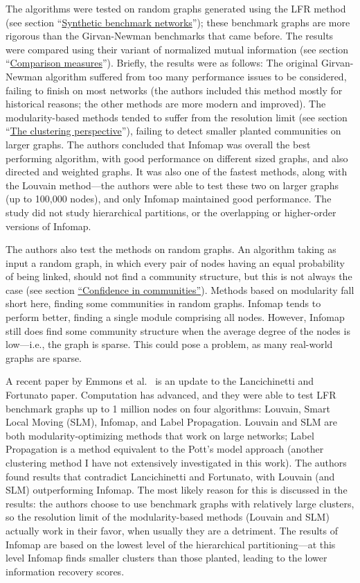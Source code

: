 The algorithms were tested on random graphs generated using the LFR
method (see section
``\protect\hyperlink{synthetic-benchmark-networks}{Synthetic benchmark
networks}''); these benchmark graphs are more rigorous than the
Girvan-Newman benchmarks that came before. The results were compared
using their variant of normalized mutual information (see section
``\protect\hyperlink{comparison-measures}{Comparison measures}'').
Briefly, the results were as follows: The original Girvan-Newman
algorithm suffered from too many performance issues to be considered,
failing to finish on most networks (the authors included this method
mostly for historical reasons; the other methods are more modern and
improved). The modularity-based methods tended to suffer from the
resolution limit (see section
``\protect\hyperlink{the-clustering-perspective}{The clustering
perspective}''), failing to detect smaller planted communities on larger
graphs. The authors concluded that Infomap was overall the best
performing algorithm, with good performance on different sized graphs,
and also directed and weighted graphs. It was also one of the fastest
methods, along with the Louvain method---the authors were able to test
these two on larger graphs (up to 100,000 nodes), and only Infomap
maintained good performance. The study did not study hierarchical
partitions, or the overlapping or higher-order versions of Infomap.

The authors also test the methods on random graphs. An algorithm taking
as input a random graph, in which every pair of nodes having an equal
probability of being linked, should not find a community structure, but
this is not always the case (see section
\protect\hyperlink{confidence-in-communities}{``Confidence in
communities''}). Methods based on modularity fall short here, finding
some communities in random graphs. Infomap tends to perform better,
finding a single module comprising all nodes. However, Infomap still
does find some community structure when the average degree of the nodes
is low---i.e., the graph is sparse. This could pose a problem, as many
real-world graphs are sparse.

A recent paper by Emmons et al.~\autocite{emmons_analysis_2016} is an
update to the Lancichinetti and Fortunato paper. Computation has
advanced, and they were able to test LFR benchmark graphs up to 1
million nodes on four algorithms: Louvain, Smart Local Moving (SLM),
Infomap, and Label Propagation. Louvain and SLM are both
modularity-optimizing methods that work on large networks; Label
Propagation is a method equivalent to the Pott's model approach (another
clustering method I have not extensively investigated in this work). The
authors found results that contradict Lancichinetti and Fortunato, with
Louvain (and SLM) outperforming Infomap. The most likely reason for this
is discussed in the results: the authors choose to use benchmark graphs
with relatively large clusters, so the resolution limit of the
modularity-based methods (Louvain and SLM) actually work in their favor,
when usually they are a detriment. The results of Infomap are based on
the lowest level of the hierarchical partitioning---at this level
Infomap finds smaller clusters than those planted, leading to the lower
information recovery scores.
